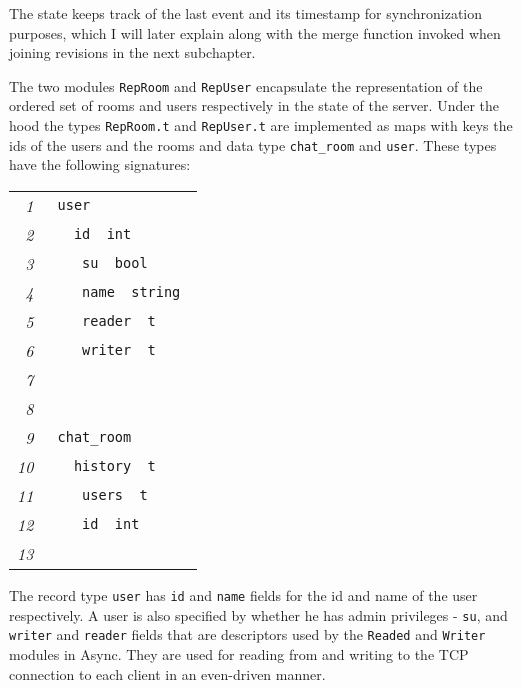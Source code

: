 \documentclass[12pt,twoside,notitlepage]{report}
\newcommand{\mlkeyword}[1]{\mbox{\color{red}{#1}}}
\newcommand{\mloperator}[1]{\mbox{\color{darkgreen}{#1}}}
\newcommand{\mlmodulename}[1]{\mbox{\color{navy}{#1}}}
\newcommand{\mlcodeline}[2]{\tiny\sl #1 & \begin{minipage}[c]{0.8\linewidth}\begin{alltt}\mbox{#2}\end{alltt}\end{minipage}\\}
\begin{document}
{{}

The state keeps track of the last event and its timestamp for synchronization purposes, which I will later explain along with the merge function invoked when joining revisions in the next subchapter.

The two modules {\tt RepRoom} and {\tt RepUser} encapsulate the representation of the ordered set of rooms and users respectively in the state of the server. Under the hood the types {\tt RepRoom.t} and {\tt RepUser.t} are implemented as maps with keys the ids of the users and the rooms and data type {\tt chat\_room} and {\tt user}. These types have the following signatures:

\begin{comment}

type user =
  { id : int;  
    su : bool;
    name : string;
    reader : Reader.t;
    writer : Writer.t;
  }

type chat_room = 
  { history : RepMessage.t;
    users : RepUser.t;
    id : int;
  }
  
\end{comment} 
  
{\scriptsize\noindent\begin{longtable}{r|l}
\mlcodeline{1}{\mlkeyword{type}~user~\mlkeyword{=}
}
\mlcodeline{2}{~~\mloperator{\{}~id~\mloperator{\mbox{\COLON}}~int\mloperator{\mbox{\SC}}~~
}
\mlcodeline{3}{~~~~su~\mloperator{\mbox{\COLON}}~bool\mloperator{\mbox{\SC}}
}
\mlcodeline{4}{~~~~name~\mloperator{\mbox{\COLON}}~string\mloperator{\mbox{\SC}}
}
\mlcodeline{5}{~~~~reader~\mloperator{\mbox{\COLON}}~\mlmodulename{Reader}\mbox{}\mloperator{.}t\mloperator{\mbox{\SC}}
}
\mlcodeline{6}{~~~~writer~\mloperator{\mbox{\COLON}}~\mlmodulename{Writer}\mbox{}\mloperator{.}t\mloperator{\mbox{\SC}}
}
\mlcodeline{7}{~~\mloperator{\}}
}
\mlcodeline{8}{
}
\mlcodeline{9}{\mlkeyword{type}~chat\_{}room~\mlkeyword{=}~
}
\mlcodeline{10}{~~\mloperator{\{}~history~\mloperator{\mbox{\COLON}}~\mlmodulename{RepMessage}\mbox{}\mloperator{.}t\mloperator{\mbox{\SC}}
}
\mlcodeline{11}{~~~~users~\mloperator{\mbox{\COLON}}~\mlmodulename{RepUser}\mbox{}\mloperator{.}t\mloperator{\mbox{\SC}}
}
\mlcodeline{12}{~~~~id~\mloperator{\mbox{\COLON}}~int\mloperator{\mbox{\SC}}
}
\mlcodeline{13}{~~\mloperator{\}}}
\end{longtable}
}

The record type {\tt user} has {\tt id} and {\tt name} fields for the id and name of the user respectively. A user is also specified by whether he has admin privileges - {\tt su}, and {\tt writer} and {\tt reader} fields that are descriptors used by the {\tt Readed} and {\tt Writer} modules in Async. They are used for reading from and writing to the TCP connection to each client in an even-driven manner.

}
\end{document}
